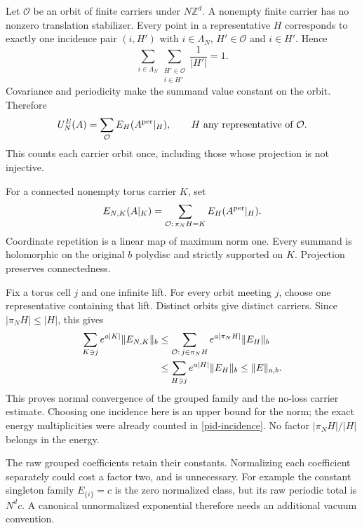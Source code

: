 Let $\mathcal O$ be an orbit of finite carriers under
$N\mathbb Z^d$. A nonempty finite carrier has no nonzero
translation stabilizer. Every point in a representative $H$
corresponds to exactly one incidence pair $(i,H')$ with
$i\in\Lambda_N$, $H'\in\mathcal O$ and $i\in H'$. Hence
\begin{equation}
 \sum_{i\in\Lambda_N}\sum_{\substack{H'\in\mathcal O\\ i\in H'}}
                      \frac1{|H'|}=1.
 \label{pid-incidence}
\end{equation}
Covariance and periodicity make the summand value constant on
the orbit. Therefore
\begin{equation}
 U_N^E(A)=\sum_{\mathcal O}E_H(A^{\rm per}|_H),
                   \qquad H\text{ any representative of }\mathcal O.
 \label{pid-orbit-sum}
\end{equation}
This counts each carrier orbit once, including those whose
projection is not injective.

For a connected nonempty torus carrier $K$, set
\begin{equation}
 E_{N,K}(A|_K)=
       \sum_{\mathcal O:\,\pi_NH=K}E_H(A^{\rm per}|_H).
 \label{pid-grouped-family}
\end{equation}
Coordinate repetition is a linear map of maximum norm one.
Every summand is holomorphic on the original $b$ polydisc and
strictly supported on $K$. Projection preserves connectedness.

Fix a torus cell $j$ and one infinite lift. For every orbit
meeting $j$, choose one representative containing that lift.
Distinct orbits give distinct carriers. Since
$|\pi_NH|\le|H|$, this gives
\begin{align}
 \sum_{K\ni j}e^{a|K|}\|E_{N,K}\|_b
 &\le\sum_{\mathcal O:\,j\in\pi_NH}
                         e^{a|\pi_NH|}\|E_H\|_b\notag\\
 &\le\sum_{H\ni j}e^{a|H|}\|E_H\|_b
 \le\|E\|_{a,b}.
 \label{pid-wrapped-bound}
\end{align}
This proves normal convergence of the grouped family and the
no-loss carrier estimate. Choosing one incidence here is an
upper bound for the norm; the exact energy multiplicities were
already counted in \eqref{pid-incidence}. No factor
$|\pi_NH|/|H|$ belongs in the energy.

The raw grouped coefficients retain their constants. Normalizing
each coefficient separately could cost a factor two, and is
unnecessary. For example the constant singleton family
$E_{\{i\}}=c$ is the zero normalized class, but its raw periodic
total is $N^dc$. A canonical unnormalized exponential therefore
needs an additional vacuum convention.

